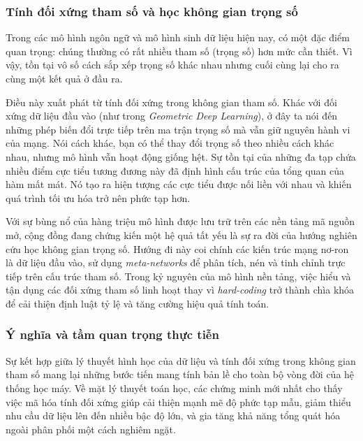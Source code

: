 \subsubsection{Tính đối xứng tham số và học không gian trọng số}
\label{subsubsec:doi-xung-tham-so}

Trong các mô hình ngôn ngữ và mô hình sinh dữ liệu hiện nay, có một đặc điểm quan trọng: chúng thường có rất nhiều tham số (trọng số) hơn mức cần thiết. Vì vậy, tồn tại vô số cách sắp xếp trọng số khác nhau nhưng cuối cùng lại cho ra cùng một kết quả ở đầu ra.

Điều này xuất phát từ tính đối xứng trong không gian tham số. Khác với đối xứng dữ liệu đầu vào (như trong \textit{Geometric Deep Learning}), ở đây ta nói đến những phép biến đổi trực tiếp trên ma trận trọng số mà vẫn giữ nguyên hành vi của mạng. Nói cách khác, bạn có thể thay đổi trọng số theo nhiều cách khác nhau, nhưng mô hình vẫn hoạt động giống hệt. Sự tồn tại của những đa tạp chứa nhiều điểm cực tiểu tương đương này đã định hình cấu trúc của tổng quan của hàm mất mát. Nó tạo ra hiện tượng các cực tiểu được nối liền với nhau và khiến quá trình tối ưu hóa trở nên phức tạp hơn.

\begin{morong}
Với sự bùng nổ của hàng triệu mô hình được lưu trữ trên các nền tảng mã nguồn mở, cộng đồng đang chứng kiến một hệ quả tất yếu là sự ra đời của hướng nghiên cứu học không gian trọng số. Hướng đi này coi chính các kiến trúc mạng nơ-ron là dữ liệu đầu vào, sử dụng \textit{meta-networks} để phân tích, nén và tinh chỉnh trực tiếp trên cấu trúc tham số. Trong kỷ nguyên của mô hình nền tảng, việc hiểu và tận dụng các đối xứng tham số linh hoạt thay vì \textit{hard-coding} trở thành chìa khóa để cải thiện định luật tỷ lệ và tăng cường hiệu quả tính toán.
\end{morong}


\subsubsection{Ý nghĩa và tầm quan trọng thực tiễn}
\label{subsubsec:y-nghia-thuc-tien}

Sự kết hợp giữa lý thuyết hình học của dữ liệu và tính đối xứng trong không gian tham số mang lại những bước tiến mang tính bản lề cho toàn bộ vòng đời của hệ thống học máy. Về mặt lý thuyết toán học, các chứng minh mới nhất cho thấy việc mã hóa tính đối xứng giúp cải thiện mạnh mẽ độ phức tạp mẫu, giảm thiểu nhu cầu dữ liệu lên đến nhiều bậc độ lớn, và gia tăng khả năng tổng quát hóa ngoài phân phối một cách nghiêm ngặt.

